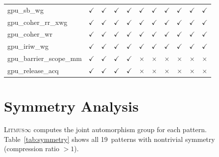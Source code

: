 \documentclass[10pt]{article}
\newcommand{\litmus}{\textsc{Litmus$\infty$}}
\newcommand{\cmark}{$\checkmark$}
\newcommand{\xmark}{$\times$}
\begin{document}
{\begin{table}[p]
\begin{tabular}{l cccc cccccc}
gpu\_sb\_wg & \cmark & \cmark & \cmark & \cmark & \cmark & \cmark & \cmark & \cmark & \cmark & \cmark \\
gpu\_coher\_rr\_xwg & \cmark & \cmark & \cmark & \cmark & \cmark & \cmark & \cmark & \cmark & \cmark & \cmark \\
gpu\_coher\_wr & \cmark & \cmark & \cmark & \cmark & \cmark & \cmark & \cmark & \cmark & \cmark & \cmark \\
gpu\_iriw\_wg & \cmark & \cmark & \cmark & \cmark & \cmark & \cmark & \cmark & \cmark & \cmark & \cmark \\
gpu\_barrier\_scope\_mm & \cmark & \cmark & \cmark & \cmark & \xmark & \xmark & \xmark & \xmark & \xmark & \xmark \\
gpu\_release\_acq & \cmark & \cmark & \cmark & \cmark & \xmark & \xmark & \xmark & \xmark & \xmark & \xmark \\
\bottomrule
\end{tabular}
\end{table}
}

\section{Symmetry Analysis}
\label{app:symmetry}

\litmus{} computes the joint automorphism group for each pattern.
Table~\ref{tab:symmetry} shows all 19~patterns with nontrivial
symmetry (compression ratio $> 1$).
\end{document}
